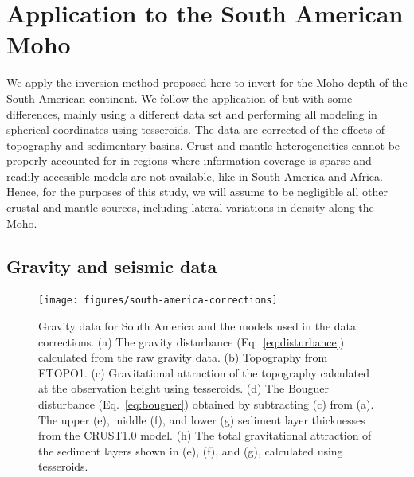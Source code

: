 \documentclass[extra,mreferee]{gji}
\begin{document}
\section{Application to the South American Moho}


We apply the inversion method proposed here to invert for the Moho depth of the
South American continent.
We follow the application of \citet{vandermeijde2013} but with some
differences, mainly using a different data set and performing all modeling
in spherical coordinates using tesseroids.
The data are corrected of the effects of topography and sedimentary basins.
Crust and mantle heterogeneities cannot be properly accounted for
in regions where information coverage is sparse and readily accessible models
are not available, like in South America and Africa.
Hence, for the purposes of this study, we will assume to be negligible all
other crustal and mantle sources, including lateral variations in density along
the Moho.


\subsection{Gravity and seismic data}

\begin{figure}
    \centering
    \texttt{[image: figures/south-america-corrections]}
    \caption{
        Gravity data for South America and the models used in the data
        corrections.
        (a) The gravity disturbance (Eq.~\ref{eq:disturbance}) calculated from
        the raw gravity data.
        (b) Topography from ETOPO1.
        (c) Gravitational attraction of the topography calculated
        at the observation height using tesseroids.
        (d) The Bouguer disturbance (Eq.~\ref{eq:bouguer}) obtained by
        subtracting (c) from (a).
        The upper (e), middle (f), and lower (g) sediment layer thicknesses
        from the CRUST1.0 model.
        (h) The total gravitational attraction of the sediment layers shown in
        (e), (f), and (g), calculated using tesseroids.
        }
    \label{fig:sam-corrections}
\end{figure}
\end{document}
